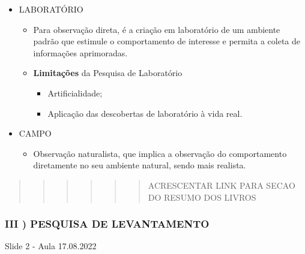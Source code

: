 \documentclass[
]{book}
\providecommand{\tightlist}{%
  \setlength{\itemsep}{0pt}\setlength{\parskip}{0pt}}
\begin{document}
\begin{itemize}
\tightlist
\item
  LABORATÓRIO

  \begin{itemize}
  \tightlist
  \item
    Para observação direta, é a criação em laboratório de um ambiente padrão que estimule o comportamento de interesse e permita a coleta de informações aprimoradas.
  \item
    \textbf{Limitações} da Pesquisa de Laboratório

    \begin{itemize}
    \tightlist
    \item
      Artificialidade;
    \item
      Aplicação das descobertas de laboratório à vida real.
    \end{itemize}
  \end{itemize}
\item
  CAMPO

  \begin{itemize}
  \tightlist
  \item
    Observação naturalista, que implica a observação do comportamento diretamente no seu ambiente natural, sendo mais realista.
  \end{itemize}
\end{itemize}

\begin{quote}
\begin{quote}
\begin{quote}
\begin{quote}
\begin{quote}
\begin{quote}
ACRESCENTAR LINK PARA SECAO DO RESUMO DOS LIVROS
\end{quote}
\end{quote}
\end{quote}
\end{quote}
\end{quote}
\end{quote}

\hypertarget{iii-pesquisa-de-levantamento-1}{%
\subsubsection{III ) PESQUISA DE LEVANTAMENTO}\label{iii-pesquisa-de-levantamento-1}}

Slide 2 - Aula 17.08.2022
\end{document}
